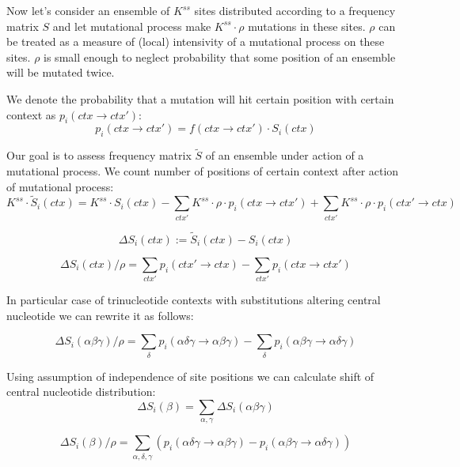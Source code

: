 \documentclass[a4paper]{article}
\begin{document}
Now let's consider an ensemble of $K^{ss}$ sites distributed according to a frequency matrix $S$ and let mutational process make $K^{ss}\cdot\rho$ mutations in these sites. $\rho$ can be treated as a measure of (local) intensivity of a mutational process on these sites. $\rho$ is small enough to neglect probability that some position of an ensemble will be mutated twice.

We denote the probability that a mutation will hit certain position with certain context as $p_i(ctx\to ctx')$:
\begin{equation}
p_i(ctx \to ctx') = f(ctx \to ctx')\cdot S_i(ctx)
\end{equation}

Our goal is to assess frequency matrix $\widetilde{S}$ of an ensemble under action of a mutational process. We count number of positions of certain context after action of mutational process:
\begin{equation}
K^{ss}\cdot\widetilde{S}_i(ctx) = K^{ss}\cdot S_i(ctx) - \sum_{ctx'} K^{ss}\cdot\rho\cdot p_i(ctx \to ctx') + \sum_{ctx'} K^{ss}\cdot\rho\cdot p_i(ctx' \to ctx)
\end{equation}

\begin{equation}
\Delta S_i(ctx) := \widetilde{S}_i(ctx) - S_i(ctx)
\end{equation}

\begin{equation}
\boxed{ \Delta S_i(ctx) / \rho = \sum_{ctx'} p_i(ctx' \to ctx) - \sum_{ctx'} p_i(ctx \to ctx') }
\end{equation}

In particular case of trinucleotide contexts with substitutions altering central nucleotide we can rewrite it as follows:

\begin{equation}
\Delta S_i(\alpha\beta\gamma) / \rho = \sum_{\delta} p_i(\alpha\delta\gamma \to \alpha\beta\gamma) - \sum_{\delta} p_i(\alpha\beta\gamma \to \alpha\delta\gamma)
\end{equation}

Using assumption of independence of site positions we can calculate shift of central nucleotide distribution:
\begin{equation}
\Delta S_i(\beta) = \sum_{\alpha, \gamma}\Delta S_i(\alpha\beta\gamma)
\end{equation}

\begin{equation}
\Delta S_i(\beta) / \rho = \sum_{\alpha,\delta,\gamma}\left(p_i(\alpha\delta\gamma \to \alpha\beta\gamma) - p_i(\alpha\beta\gamma \to \alpha\delta\gamma)\right)
\end{equation}
\end{document}
